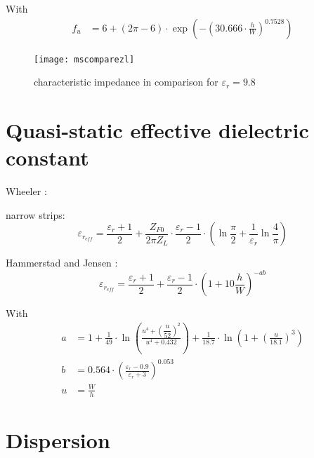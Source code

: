 \documentclass[10pt]{report}
\begin{document}
With
\begin{align}
f_{u} &= 6 + \left(2\pi - 6\right)\cdot\exp{\left(-\left(30.666\cdot\frac{h}{W}\right)^{0.7528}\right)}
\end{align}

\begin{figure}[ht]
\begin{center}
\texttt{[image: mscomparezl]}
\end{center}
\caption{characteristic impedance in comparison for $\varepsilon_{r} = 9.8$}
\label{fig:mscomparezl}
\end{figure}
\FloatBarrier

\section{Quasi-static effective dielectric constant}

Wheeler \cite{Wheeler}:

narrow strips:
\begin{equation}
\varepsilon_{r_{eff}} = \frac{\varepsilon_{r} + 1}{2} + \frac{Z_{F0}}{2\pi Z_{L}}\cdot \frac{\varepsilon_{r} - 1}{2}\cdot \left(\ln{\frac{\pi}{2}} + \frac{1}{\varepsilon_{r}} \ln{\frac{4}{\pi}}\right)
\end{equation}

Hammerstad and Jensen \cite{Hammerstad}:
\begin{equation}
\varepsilon_{r_{eff}} = \frac{\varepsilon_{r} + 1}{2} + \frac{\varepsilon_{r} - 1}{2}\cdot\left(1 + 10\frac{h}{W}\right)^{-ab}
\end{equation}

With
\begin{align}
a &= 1 + \frac{1}{49}\cdot\ln{\left(\frac{u^{4} + \left(\dfrac{u}{52}\right)^{2}}{u^{4} + 0.432}\right)} + \frac{1}{18.7}\cdot\ln{\left(1 + \left(\frac{u}{18.1}\right)^{3}\right)}\\
b &= 0.564\cdot\left(\frac{\varepsilon_{r} - 0.9}{\varepsilon_{r} + 3}\right)^{0.053}\\
u &= \frac{W}{h}
\end{align}

\section{Dispersion}
\end{document}
